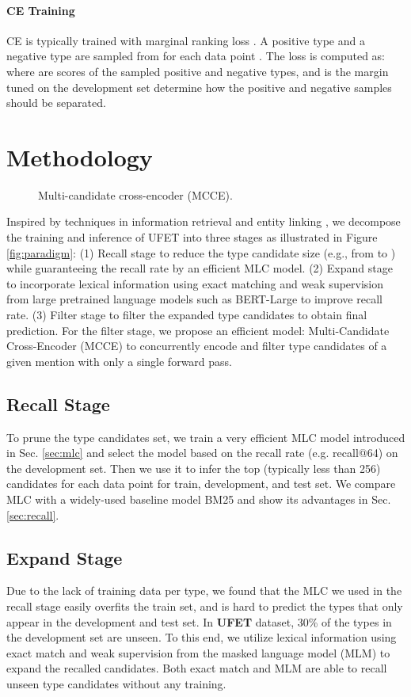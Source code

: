 \documentclass[11pt]{article}
\begin{document}
\paragraph{CE Training} CE is typically trained with marginal ranking loss \cite{lite}. A positive type  and a negative type  are sampled from  for each data point . The loss is computed as:
 where  are scores of the sampled positive and negative types, and  is the margin tuned on the development set determine how the positive and negative samples should be separated. \section{Methodology}
\begin{figure*}[t]
    \centering
    \caption{Multi-candidate cross-encoder (MCCE).}
    \label{fig:ccf}
\end{figure*}
Inspired by techniques in information retrieval \cite{ir} and entity linking \cite{wu2019zero}, we decompose the training and inference of UFET into three stages as illustrated in Figure \ref{fig:paradigm}: (1) Recall stage to reduce the type candidate size (e.g., from  to ) while guaranteeing the recall rate by an efficient MLC model. (2) Expand stage to incorporate lexical information using exact matching and weak supervision \cite{mlmet} from large pretrained language models such as BERT-Large \cite{bert} to improve recall rate. (3) Filter stage to filter the expanded type candidates to obtain final prediction. For the filter stage, we propose an efficient model: Multi-Candidate Cross-Encoder (MCCE) to concurrently encode and filter type candidates of a given mention with only a single forward pass. 
\subsection{Recall Stage}
To prune the type candidates set, we train a very efficient MLC model introduced in Sec. \ref{sec:mlc} and select the model based on the recall rate (e.g. recall@64) on the development set. Then we use it to infer the top  (typically less than 256) candidates  for each data point  for train, development, and test set. We compare MLC with a widely-used baseline model BM25 \cite{bm25} and show its advantages in Sec. \ref{sec:recall}. 
\subsection{Expand Stage}
Due to the lack of training data per type, we found that the MLC we used in the recall stage easily overfits the train set, and is hard to predict the types that only appear in the development and test set. In {\bf \textsc{UFET}} dataset, 30\% of the types in the development set are unseen. To this end, we utilize lexical information using exact match and weak supervision from the masked language model (MLM) to expand the recalled candidates. Both exact match and MLM are able to recall unseen type candidates without any training. 
\end{document}
